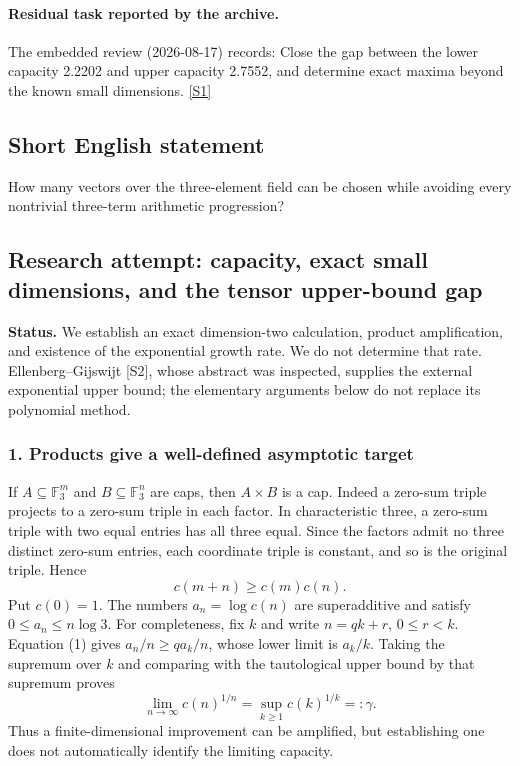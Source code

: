 \documentclass[11pt,a4paper]{article}
\newcommand{\sref}[2]{\hyperlink{source:#1:#2}{[S#2]}}
\begin{document}
\paragraph{Residual task reported by the archive.}

The embedded review (2026-08-17) records: Close the gap between the lower capacity 2.2202 and upper capacity 2.7552, and determine exact maxima beyond the known small dimensions. \sref{1231}{1}

\subsection{Short English statement}

How many vectors over the three-element field can be chosen while avoiding every nontrivial three-term arithmetic progression?

\subsection{Research attempt: capacity, exact small dimensions, and the tensor upper-bound gap}
\textbf{Status.} We establish an exact dimension-two calculation, product amplification, and existence of the exponential growth rate. We do not determine that rate. Ellenberg--Gijswijt [S2], whose abstract was inspected, supplies the external exponential upper bound; the elementary arguments below do not replace its polynomial method.

\subsubsection{1. Products give a well-defined asymptotic target}
If $A\subseteq\mathbb F_3^m$ and $B\subseteq\mathbb F_3^n$ are caps, then $A\times B$ is a cap. Indeed a zero-sum triple projects to a zero-sum triple in each factor. In characteristic three, a zero-sum triple with two equal entries has all three equal. Since the factors admit no three distinct zero-sum entries, each coordinate triple is constant, and so is the original triple. Hence
\[c(m+n)\geq c(m)c(n).\tag{1}\]
Put $c(0)=1$. The numbers $a_n=\log c(n)$ are superadditive and satisfy $0\leq a_n\leq n\log3$. For completeness, fix $k$ and write $n=qk+r$, $0\leq r<k$. Equation (1) gives $a_n/n\geq q a_k/n$, whose lower limit is $a_k/k$. Taking the supremum over $k$ and comparing with the tautological upper bound by that supremum proves
\[\lim_{n\to\infty}c(n)^{1/n}
=\sup_{k\geq1}c(k)^{1/k}=:\gamma.\tag{2}\]
Thus a finite-dimensional improvement can be amplified, but establishing one does not automatically identify the limiting capacity.
\end{document}
